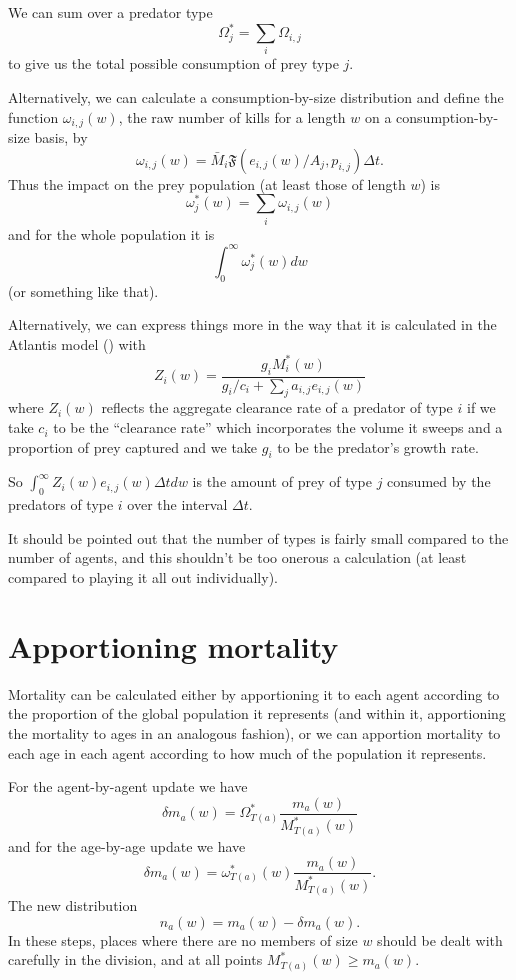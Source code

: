 We can sum over a predator type
\[ \Omega_j^{\ast} = \sum_i \Omega_{i,j} \]
to give us the total possible consumption of prey type $j$.

Alternatively, we can calculate a consumption-by-size distribution and define
the function $\omega_{i,j} (w)$, the raw number of kills for a length $w$ on a
consumption-by-size basis, by
\[ \omega_{i,j} (w) = \bar{M}_i \mathfrak{F} (e_{i,j} (w) / A_j, p_{i,j})
   \Delta t. \]
Thus the impact on the prey population (at least those of length $w$) is
\[ \omega_j^{\ast} (w) = \sum_i \omega_{i,j} (w) \]
and for the whole population it is
\[ \int_0^{\infty} \omega^{\ast}_j (w) d w \]
(or something like that).

Alternatively, we can express things more in the way that it is
calculated in the Atlantis model (\cite{Fulton2011pcomm}) with
\[ Z_i (w) = \frac{g_i M^{\ast}_i (w)}{g_i / c_i + \sum_j a_{i,j} e_{i,j} (w)}
\]
where $Z_i (w)$ reflects the aggregate clearance rate of a predator of type
$i$ if we take $c_i$ to be the ``clearance rate'' which incorporates the
volume it sweeps and a proportion of prey captured and we take $g_i$ to be the
predator's growth rate.

So $\int_0^{\infty} Z_i (w) e_{i,j} (w) \Delta t d w$ is the amount of prey of
type $j$ consumed by the predators of type $i$ over the interval $\Delta t$.



It should be pointed out that the number of types is fairly small compared to
the number of agents, and this shouldn't be too onerous a calculation (at
least compared to playing it all out individually).

\section{Apportioning mortality}

Mortality can be calculated either by apportioning it to each agent according
to the proportion of the global population it represents (and within it,
apportioning the mortality to ages in an analogous fashion), or we can
apportion mortality to each age in each agent according to how much of the
population it represents.

For the agent-by-agent update we have
\[ \delta m_a (w) = \Omega^{\ast}_{T (a)}  \frac{m_a (w)}{M^{\ast}_{T (a)}
   (w)} \]
and for the age-by-age update we have
\[ \delta m_a (w) = \omega^{\ast}_{T (a)} (w)  \frac{m_a (w)}{M^{\ast}_{T (a)}
   (w)} . \]
The new distribution
\[ n_a (w) = m_a (w) - \delta m_a (w) . \]
In these steps, places where there are no members of size $w$ should be dealt
with carefully in the division, and at all points $M^{\ast}_{T (a)} (w)
\geqslant m_a (w)$.






